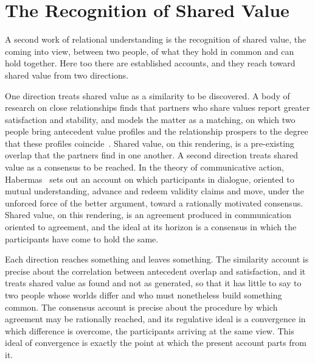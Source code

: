 \section{The Recognition of Shared Value}
\label{p27:sec:sharedvalue}

\noindent
A second work of relational understanding is the recognition of shared value, the coming into view, between two people, of what they hold in common and can hold together. Here too there are established accounts, and they reach toward shared value from two directions.

One direction treats shared value as a similarity to be discovered. A body of research on close relationships finds that partners who share values report greater satisfaction and stability, and models the matter as a matching, on which two people bring antecedent value profiles and the relationship prospers to the degree that these profiles coincide~\parencite{byrne1971attraction}. Shared value, on this rendering, is a pre-existing overlap that the partners find in one another. A second direction treats shared value as a consensus to be reached. In the theory of communicative action, Habermas~\parencite{habermas1984theory} sets out an account on which participants in dialogue, oriented to mutual understanding, advance and redeem validity claims and move, under the unforced force of the better argument, toward a rationally motivated consensus. Shared value, on this rendering, is an agreement produced in communication oriented to agreement, and the ideal at its horizon is a consensus in which the participants have come to hold the same.

Each direction reaches something and leaves something. The similarity account is precise about the correlation between antecedent overlap and satisfaction, and it treats shared value as found and not as generated, so that it has little to say to two people whose worlds differ and who must nonetheless build something common. The consensus account is precise about the procedure by which agreement may be rationally reached, and its regulative ideal is a convergence in which difference is overcome, the participants arriving at the same view. This ideal of convergence is exactly the point at which the present account parts from it.

